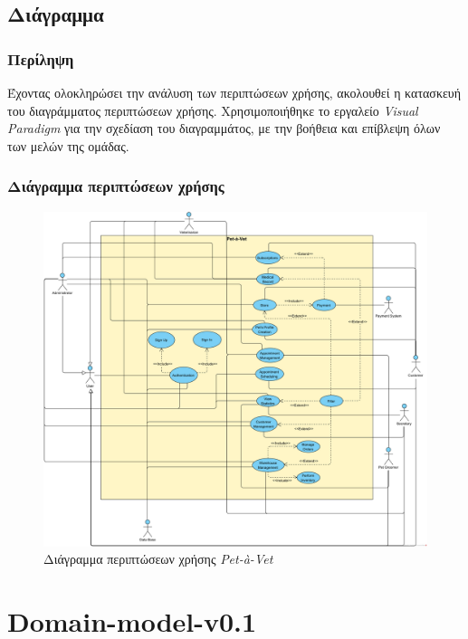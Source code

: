 \documentclass[12pt,a4paper,twoside]{book}
\begin{document}
\section{Διάγραμμα} %

\subsection{Περίληψη}

Έχοντας ολοκληρώσει την ανάλυση των περιπτώσεων χρήσης, ακολουθεί η κατασκευή του διαγράμματος περιπτώσεων χρήσης. Χρησιμοποιήθηκε το εργαλείο \textit{Visual Paradigm} για την σχεδίαση του διαγραμμάτος, με την βοήθεια και επίβλεψη όλων των μελών της ομάδας. %

\subsection{Διάγραμμα περιπτώσεων χρήσης}

\begin{figure}[H]
  \centering
  \includegraphics[width=1\textwidth]{Resources/Use-casel-v0.1.png}
  \caption{Διάγραμμα περιπτώσεων χρήσης \textit{Pet-à-Vet}}\label{fig:use-case-diagram}
\end{figure}

\chapter{Domain-model-v0.1}
\end{document}
